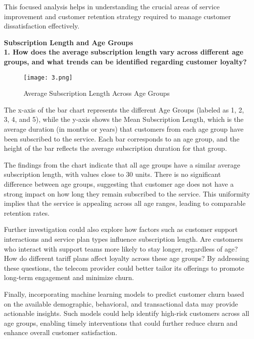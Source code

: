 \documentclass[12pt]{article}
\begin{document}
This focused analysis helps in understanding the crucial areas of service improvement and customer retention strategy required to manage customer dissatisfaction effectively.

\vspace{0.5cm}

\textbf{Subscription Length and Age Groups}\\

\textbf{1. How does the average subscription length vary across different age groups, and what trends can be identified regarding customer loyalty?}
\begin{figure}[h]
    \centering
    \texttt{[image: 3.png]}  
    \caption{Average Subscription Length Across Age Groups}
\end{figure}
\FloatBarrier
The x-axis of the bar chart represents the different Age Groups (labeled as 1, 2, 3, 4, and 5), while the y-axis shows the Mean Subscription Length, which is the average duration (in months or years) that customers from each age group have been subscribed to the service. Each bar corresponds to an age group, and the height of the bar reflects the average subscription duration for that group.

The findings from the chart indicate that all age groups have a similar average subscription length, with values close to 30 units. There is no significant difference between age groups, suggesting that customer age does not have a strong impact on how long they remain subscribed to the service. This uniformity implies that the service is appealing across all age ranges, leading to comparable retention rates.

Further investigation could also explore how factors such as customer support interactions and service plan types influence subscription length. Are customers who interact with support teams more likely to stay longer, regardless of age? How do different tariff plans affect loyalty across these age groups? By addressing these questions, the telecom provider could better tailor its offerings to promote long-term engagement and minimize churn.

Finally, incorporating machine learning models to predict customer churn based on the available demographic, behavioral, and transactional data may provide actionable insights. Such models could help identify high-risk customers across all age groups, enabling timely interventions that could further reduce churn and enhance overall customer satisfaction.
\vspace{0.5cm}
\end{document}
